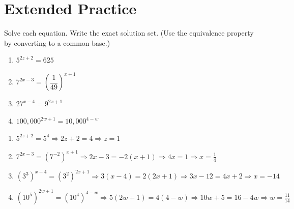 \documentclass{ximera}
\begin{document}
\bigskip
\section*{Extended Practice}

\begin{problem}
Solve each equation. Write the exact solution set. (Use the equivalence property by converting to a common base.)
\begin{enumerate}
  \item[(a)] $5^{2z+2} = 625$
  \medskip
  \item[(b)] $7^{2x-3} = \left(\dfrac{1}{49}\right)^{x+1}$
  \medskip
  \item[(c)] $27^{x-4} = 9^{2x+1}$
  \medskip
  \item[(d)] $100{,}000^{2w+1} = 10{,}000^{4-w}$
\end{enumerate}

\begin{solution}
\begin{enumerate}
  \item[(a)] $5^{2z+2} = 5^4 \Rightarrow 2z+2=4 \Rightarrow \boxed{z=1}$

  \item[(b)] $7^{2x-3} = (7^{-2})^{x+1} \Rightarrow 2x-3 = -2(x+1) \Rightarrow 4x=1 \Rightarrow \boxed{x=\tfrac{1}{4}}$

  \item[(c)] $(3^3)^{x-4} = (3^2)^{2x+1} \Rightarrow 3(x-4)=2(2x+1) \Rightarrow 3x-12=4x+2 \Rightarrow \boxed{x=-14}$

  \item[(d)] $(10^5)^{2w+1} = (10^4)^{4-w} \Rightarrow 5(2w+1)=4(4-w) \Rightarrow 10w+5=16-4w \Rightarrow \boxed{w=\tfrac{11}{14}}$
\end{enumerate}
\end{solution}
\end{problem}
\end{document}

